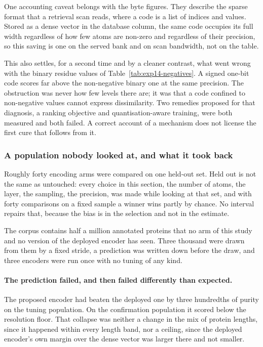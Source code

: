 \begin{table}[htbp]
  \centering
  \caption{Maximum F-measure against the bits kept per stored value, with the bytes a
  code occupies in the sparse retrieval format. $^{*}$~the 95\,\% interval excludes
  zero.}
  \label{tab:exp14-quantisation}
  
\end{table}

One accounting caveat belongs with the byte figures. They describe the sparse format
that a retrieval scan reads, where a code is a list of indices and values. Stored as a
dense vector in the database column, the same code occupies its full width regardless
of how few atoms are non-zero and regardless of their precision, so this saving is one
on the served bank and on scan bandwidth, not on the table.

This also settles, for a second time and by a cleaner contrast, what went wrong with
the binary residue values of Table~\ref{tab:exp14-negatives}. A signed one-bit code
scores far above the non-negative binary one at the same precision. The obstruction
was never how few levels there are; it was that a code confined to non-negative
values cannot express dissimilarity. Two remedies proposed for that diagnosis, a
ranking objective and quantisation-aware training, were both measured and both failed.
A correct account of a mechanism does not license the first cure that follows from it.

\subsubsection{A population nobody looked at, and what it took back}
\label{sec:exp14-confirmation}

Roughly forty encoding arms were compared on one held-out set. Held out is not the
same as untouched: every choice in this section, the number of atoms, the layer, the
sampling, the precision, was made while looking at that set, and with forty
comparisons on a fixed sample a winner wins partly by chance. No interval repairs
that, because the bias is in the selection and not in the estimate.

The corpus contains half a million annotated proteins that no arm of this study and
no version of the deployed encoder has seen. Three thousand were drawn from them by a
fixed stride, a prediction was written down before the draw, and three encoders were
run once with no tuning of any kind.

\paragraph{The prediction failed, and then failed differently than expected.} The
proposed encoder had beaten the deployed one by three hundredths of purity on the
tuning population. On the confirmation population it scored below the resolution
floor. That collapse was neither a change in the mix of protein lengths, since it
happened within every length band, nor a ceiling, since the deployed encoder's own
margin over the dense vector was larger there and not smaller.

